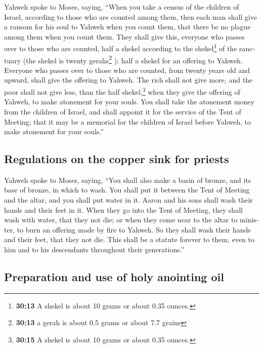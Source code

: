 \begin{paracol}{2}
\begin{otherlanguage}{english}
 Yahweh spoke to Moses, saying,  ``When
you take a census of the children of Israel, according to those who are
counted among them, then each man shall give a ransom for his soul to
Yahweh when you count them, that there be no plague among them when you
count them.  They shall give this, everyone who passes
over to those who are counted, half a shekel according to the
shekel\footnote{\textbf{30:13} A shekel is about 10 grams or about 0.35
  ounces.} of the sanctuary (the shekel is twenty gerahs\footnote{\textbf{30:13}
  a gerah is about 0.5 grams or about 7.7 grains} ); half a shekel for
an offering to Yahweh.  Everyone who passes over to those
who are counted, from twenty years old and upward, shall give the
offering to Yahweh.  The rich shall not give more, and
the poor shall not give less, than the half shekel,\footnote{\textbf{30:15}
  A shekel is about 10 grams or about 0.35 ounces.} when they give the
offering of Yahweh, to make atonement for your souls. 
You shall take the atonement money from the children of Israel, and
shall appoint it for the service of the Tent of Meeting; that it may be
a memorial for the children of Israel before Yahweh, to make atonement
for your souls.''

\hypertarget{regulations-on-the-copper-sink-for-priests}{%
\subsection{Regulations on the copper sink for
priests}\label{regulations-on-the-copper-sink-for-priests}}

 Yahweh spoke to Moses, saying,  ``You
shall also make a basin of bronze, and its base of bronze, in which to
wash. You shall put it between the Tent of Meeting and the altar, and
you shall put water in it.  Aaron and his sons shall wash
their hands and their feet in it.  When they go into the
Tent of Meeting, they shall wash with water, that they not die; or when
they come near to the altar to minister, to burn an offering made by
fire to Yahweh.  So they shall wash their hands and their
feet, that they not die. This shall be a statute forever to them, even
to him and to his descendants throughout their generations.''

\hypertarget{preparation-and-use-of-holy-anointing-oil}{%
\subsection{Preparation and use of holy anointing
oil}\label{preparation-and-use-of-holy-anointing-oil}}


\end{otherlanguage}
\end{paracol}
